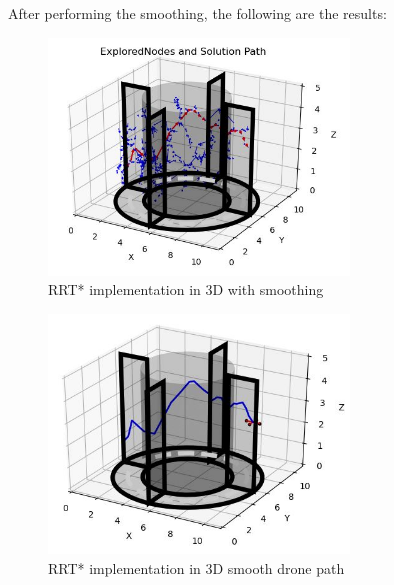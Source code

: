\documentclass{IEEEtran}
\begin{document}
After performing the smoothing, the following are the results:
\newpage
\begin{figure}[h]
    \centering
    \includegraphics[width=8cm]{rrt3dstarsmooth}
    \caption{RRT* implementation in 3D with smoothing}
    \label{fig:RRT* implementation in 3D with smoothing}
\end{figure}
\newpage
\begin{figure}[h]
    \centering
    \includegraphics[width=8cm]{rrtstar3dsmoothdrone}
    \caption{RRT* implementation in 3D smooth drone path}
    \label{fig:RRT* implementation in 3D smooth drone path}
\end{figure}
\end{document}
